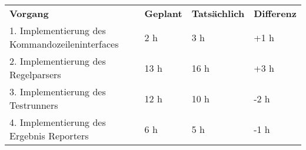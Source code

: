 \begin{tabular}{llll}
\rowcolor{heading}\textbf{Vorgang} & \textbf{Geplant} & \textbf{Tatsächlich} & \textbf{Differenz} \\
1. Implementierung des Kommandozeileninterfaces & 2 h   & 3 h   & +1 h  \\
\rowcolor{odd}2. Implementierung des Regelparsers & 13 h   & 16 h   & +3 h \\
3. Implementierung des Testrunners & 12 h  & 10 h  & -2 h \\
\rowcolor{odd}4. Implementierung des Ergebnis Reporters & 6 h   & 5 h   &  -1 h \\
\end{tabular}

